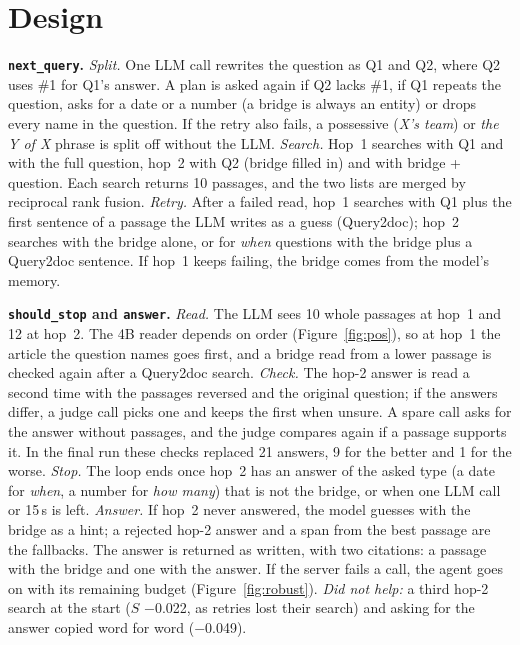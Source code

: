 \documentclass[10pt,a4paper]{article}
\begin{document}
\section{Design}
\textbf{\texttt{next\_query}.} \emph{Split.} One LLM call rewrites the question as Q1 and Q2, where Q2 uses \#1 for
Q1's answer. A plan is asked again if Q2 lacks \#1, if Q1 repeats the question, asks for a date or a number (a
bridge is always an entity) or drops every name in the question. If the retry also fails, a possessive
(\emph{X's team}) or \emph{the Y of X} phrase is split off without the LLM. \emph{Search.} Hop~1 searches with Q1
and with the full question, hop~2 with Q2 (bridge filled in) and with bridge + question. Each search returns 10
passages, and the two lists are merged by reciprocal rank fusion. \emph{Retry.} After a failed read, hop~1 searches
with Q1 plus the first sentence of a passage the LLM writes as a guess (Query2doc); hop~2 searches with the bridge
alone, or for \emph{when} questions with the bridge plus a Query2doc sentence. If hop~1 keeps failing, the bridge
comes from the model's memory.

\textbf{\texttt{should\_stop} and \texttt{answer}.} \emph{Read.} The LLM sees 10 whole passages at hop~1 and 12 at
hop~2. The 4B reader depends on order (Figure~\ref{fig:pos}), so at hop~1 the article the question names goes first,
and a bridge read from a lower passage is checked again after a Query2doc search. \emph{Check.} The hop-2 answer is
read a second time with the passages reversed and the original question; if the answers differ, a judge call picks
one and keeps the first when unsure. A spare call asks for the answer without passages, and the judge compares
again if a passage supports it. In the final run these checks replaced 21 answers, 9 for the better and 1 for the
worse. \emph{Stop.} The loop ends once hop~2 has an answer of the asked type (a date for \emph{when}, a number for
\emph{how many}) that is not the bridge, or when one LLM call or 15\,s is left. \emph{Answer.} If hop~2 never
answered, the model guesses with the bridge as a hint; a rejected hop-2 answer and a span from the best passage are
the fallbacks. The answer is returned as written, with two citations: a passage with the bridge and one with the
answer. If the server fails a call, the agent goes on with its remaining budget (Figure~\ref{fig:robust}).
\emph{Did not help:} a third hop-2 search at the start ($S$ $-$0.022, as retries lost their search) and asking for
the answer copied word for word ($-$0.049).
\end{document}
